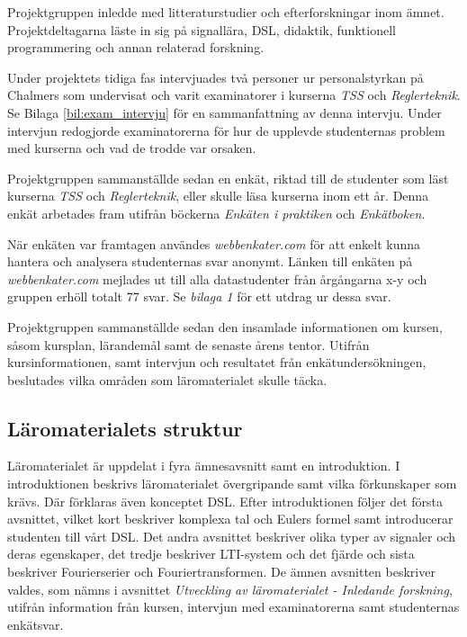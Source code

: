\documentclass[]{article}
\begin{document}
Projektgruppen inledde med litteraturstudier och efterforskningar inom ämnet. Projektdeltagarna läste in sig på
signallära, DSL, didaktik, funktionell programmering och annan relaterad forskning.

Under projektets tidiga fas intervjuades två personer ur personalstyrkan på Chalmers
som undervisat och varit examinatorer i kurserna \textit{TSS} och
\textit{Reglerteknik}.
Se Bilaga \ref{bil:exam_intervju} för en sammanfattning
av denna intervju. Under intervjun redogjorde examinatorerna för hur de upplevde
studenternas problem med kurserna och vad de trodde var orsaken.

Projektgruppen sammanställde sedan en enkät, riktad till de studenter som läst kurserna \textit{TSS} och
\textit{Reglerteknik}, eller skulle läsa kurserna inom ett år. Denna enkät arbetades fram utifrån böckerna
\textit{Enkäten i praktiken} och \textit{Enkätboken}.

När enkäten var framtagen användes \textit{webbenkater.com} för att enkelt kunna hantera och analysera studenternas svar
anonymt.
Länken till enkäten på \textit{webbenkater.com} mejlades ut till alla datastudenter från
årgångarna x-y och gruppen erhöll totalt 77 svar.  Se \textit{bilaga 1} för ett utdrag ur dessa svar.

Projektgruppen sammanställde sedan den insamlade informationen om kursen, såsom kursplan, lärandemål samt de senaste
årens tentor. Utifrån kursinformationen, samt intervjun och resultatet från enkätundersökningen, beslutades vilka
områden som läromaterialet skulle täcka.


\subsection{Läromaterialets struktur}

Läromaterialet är uppdelat i fyra ämnesavsnitt samt en introduktion. I introduktionen beskrivs läromaterialet
övergripande samt vilka förkunskaper som krävs. Där förklaras även konceptet DSL. Efter introduktionen följer det
första avsnittet, vilket kort beskriver komplexa tal och Eulers formel samt introducerar studenten till vårt DSL. Det
andra avsnittet beskriver olika typer av signaler och deras egenskaper, det tredje beskriver LTI-system och det fjärde
och sista beskriver Fourierserier och Fouriertransformen. De ämnen avsnitten beskriver valdes, som nämns i avsnittet
\textit{Utveckling av läromaterialet - Inledande forskning}, utifrån information från kursen, intervjun med
examinatorerna samt studenternas enkätsvar.
\end{document}
